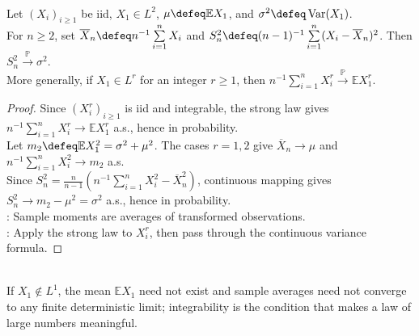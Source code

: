 \begin{proposition} \label{prop:sample-variance-consistency} \\
Let $(X_i)_{i\geq1}$ be iid, $X_1\in L^2$, $\mu\defeq\mathbb{E}X_1$, and $\sigma^2\defeq\operatorname{Var}(X_1)$.\\
For $n\geq2$, set $\overline{X}_n\defeq n^{-1}\sum\limits_{i=1}^{n}X_i$ and $S_n^2\defeq(n-1)^{-1}\sum\limits_{i=1}^{n}(X_i-\overline{X}_n)^2$. Then $S_n^2\xrightarrow{\mathbb{P}}\sigma^2$.\\
More generally, if $X_1\in L^r$ for an integer $r\geq1$, then $n^{-1}\sum\limits_{i=1}^{n}X_i^r\xrightarrow{\mathbb{P}}\mathbb{E}X_1^r$.
\begin{proof}
Since $(X_i^r)_{i\geq1}$ is iid and integrable, the strong law gives $n^{-1}\sum\limits_{i=1}^{n}X_i^r\to\mathbb{E}X_1^r$ a.s., hence in probability.\\
Let $m_2\defeq\mathbb{E}X_1^2=\sigma^2+\mu^2$. The cases $r=1,2$ give $\overline{X}_n\to\mu$ and $n^{-1}\sum\limits_{i=1}^{n}X_i^2\to m_2$ a.s.\\
Since $S_n^2=\frac{n}{n-1}(n^{-1}\sum\limits_{i=1}^{n}X_i^2-\overline{X}_n^2)$, continuous mapping gives $S_n^2\to m_2-\mu^2=\sigma^2$ a.s., hence in probability.\\
: Sample moments are averages of transformed observations.\\
: Apply the strong law to $X_i^r$, then pass through the continuous variance formula.
\end{proof}
\end{proposition}

\begin{remark} \label{rem:cauchy-averages-and-lln-hypotheses} \\
If $X_1\notin L^1$, the mean $\mathbb{E}X_1$ need not exist and sample averages need not converge to any finite deterministic limit; integrability is the condition that makes a law of large numbers meaningful.
\end{remark}
